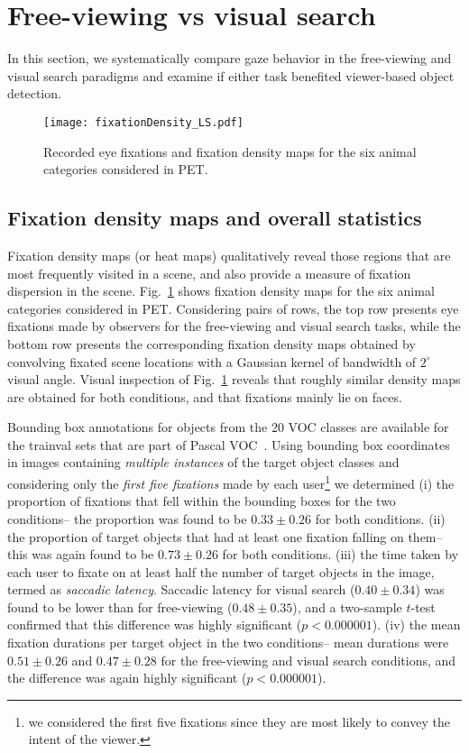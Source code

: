 \documentclass{article}
\begin{document}
\section{Free-viewing vs visual search}\label{SA}
In this section, we systematically compare gaze behavior in the free-viewing and visual search paradigms and examine if either task benefited viewer-based object detection. 

\begin{figure}[htbp]
\texttt{[image: fixationDensity\_LS.pdf]}\vspace{-.05in}
\caption{Recorded eye fixations and fixation density maps for the six animal categories considered in PET.}
\label{fig:fixdens}
\end{figure}
\vspace{-.1in}
\subsection{Fixation density maps and overall statistics}

Fixation density maps (or heat maps) qualitatively reveal those regions that are most frequently visited in a scene, and also provide a measure of fixation dispersion in the scene. Fig.~\ref{fig:fixdens} shows fixation density maps for the six animal categories considered in PET. Considering pairs of rows, the top row presents eye fixations made by observers for the free-viewing and visual search tasks, while the bottom row presents the corresponding fixation density maps obtained by convolving fixated scene locations with a Gaussian kernel of bandwidth of $2^\circ$ visual angle. Visual inspection of Fig.~\ref{fig:fixdens} reveals that roughly similar density maps are obtained for both conditions, and that fixations mainly lie on faces.



Bounding box annotations for objects from the 20 VOC classes are available for the trainval sets that are part of Pascal VOC~\cite{pascalvoc2012}. Using bounding box coordinates in images containing \textit{multiple instances} of the target object classes and considering only the \textit{first five fixations} made by each user\footnote{we considered the first five fixations since they are most likely to convey the intent of the viewer.} we determined (i) the proportion of fixations that fell within the bounding boxes for the two conditions-- the proportion was  found to be $0.33\pm0.26$ for both conditions. (ii) the proportion of target objects that had at least one fixation falling on them-- this was again found to be $0.73\pm0.26$  for both conditions. (iii) the time taken by each user to fixate on at least half the number of target objects in the image, termed as \textit{saccadic latency}. Saccadic latency for visual search ($0.40\pm0.34$) was found to be lower than for free-viewing ($0.48\pm0.35$), and a two-sample $t$-test confirmed that this difference was highly significant ($p<0.000001$). (iv) the mean fixation durations per target object in the two conditions-- mean durations were $0.51\pm0.26$ and $0.47\pm0.28$ for the free-viewing and visual search conditions, and the difference was again highly significant ($p<0.000001$).
\end{document}
